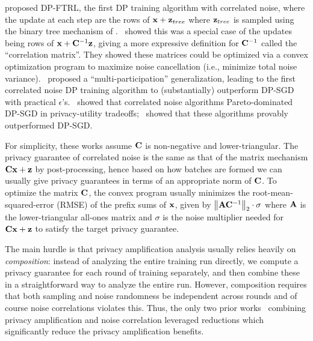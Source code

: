 \citet{kairouz2021practical} proposed DP-FTRL, the first DP training algorithm with correlated noise, where the update at each step are the rows of $\mathbf{x} + \mathbf{z}_{tree}$ where $\mathbf{z}_{tree}$ is sampled using the binary tree mechanism of \citep{Dwork-continual}.~\citet{denisov2022improved} showed this was a special case of the updates being rows of $\mathbf{x} + \mathbf{C}^{-1} \mathbf{z}$, giving a more expressive definition for $\mathbf{C}^{-1}$ called the ``correlation matrix''. They showed these matrices could be optimized via a convex optimization program to maximize noise cancellation (i.e., minimize total noise variance).~\citet{choquette2022multi} proposed a ``multi-participation'' generalization, leading to the first correlated noise DP training algorithm to (substantially) outperform DP-SGD with practical $\epsilon$'s.~\citet{choquette2024amplified} showed that correlated noise algorithms Pareto-dominated DP-SGD in privacy-utility tradeoffs;~\citet{choquette2023correlated} showed that these algorithms provably outperformed DP-SGD.

For simplicity, these works assume $\mathbf{C}$ is non-negative and lower-triangular. The privacy guarantee of correlated noise is the same as that of the matrix mechanism $\mathbf{C} \mathbf{x} + \mathbf{z}$ by post-processing, hence based on how batches are formed we can usually give privacy guarantees in terms of an appropriate norm of $\mathbf{C}$. To optimize the matrix $\mathbf{C}$, the convex program usually minimizes the root-mean-squared-error (RMSE) of the prefix sums of $\mathbf{x}$, given by $\left\|\mathbf{A} \mathbf{C}^{-1}\right\|_2 \cdot \sigma$ where $\mathbf{A}$ is the lower-triangular all-ones matrix and $\sigma$ is the noise multiplier needed for $\mathbf{C} \mathbf{x} + \mathbf{z}$ to satisfy the target privacy guarantee.

 The main hurdle is that privacy amplification analysis  usually relies heavily on \textit{composition}: instead of analyzing the entire training run directly, we compute a privacy guarantee for each round of training separately, and then combine these in a straightforward way to analyze the entire run. However, composition requires that both sampling and noise randomness be independent across rounds and of course noise correlations violates this. Thus, the only two prior works~ \citep{choquette2024amplified,choquettechoo2024privacy} combining privacy amplification and noise correlation leveraged reductions which significantly reduce the privacy amplification benefits.

